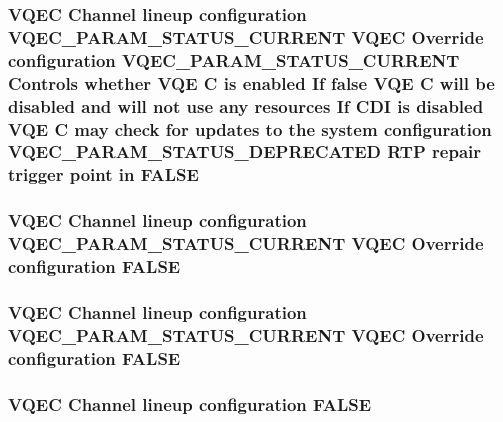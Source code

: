 \subsubsection{\setlength{\rightskip}{0pt plus 5cm}VQEC Channel lineup configuration VQEC\_\-PARAM\_\-STATUS\_\-CURRENT VQEC Override configuration VQEC\_\-PARAM\_\-STATUS\_\-CURRENT Controls whether VQE \bf{C} is enabled If false VQE \bf{C} will be disabled and will not use any resources If CDI is disabled VQE \bf{C} may check for updates \bf{to} the system configuration VQEC\_\-PARAM\_\-STATUS\_\-DEPRECATED RTP repair trigger point in \bf{FALSE}}\label{vqec__cfg__settings_8h_ab800ff96d93f95167de0aed04faaca0}


\subsubsection{\setlength{\rightskip}{0pt plus 5cm}VQEC Channel lineup configuration VQEC\_\-PARAM\_\-STATUS\_\-CURRENT VQEC Override configuration \bf{FALSE}}\label{vqec__cfg__settings_8h_fdc672e399b0251a42e251081a6c0e86}


\subsubsection{\setlength{\rightskip}{0pt plus 5cm}VQEC Channel lineup configuration VQEC\_\-PARAM\_\-STATUS\_\-CURRENT VQEC Override configuration \bf{FALSE}}\label{vqec__cfg__settings_8h_fdc672e399b0251a42e251081a6c0e86}


\subsubsection{\setlength{\rightskip}{0pt plus 5cm}VQEC Channel lineup configuration \bf{FALSE}}\label{vqec__cfg__settings_8h_239598b47c1cdb2f6f8b047de3bb847d}



